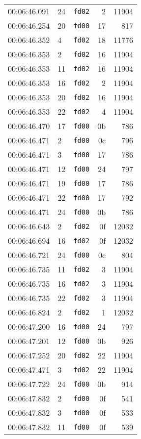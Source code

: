 \documentclass{article}
\begin{document}
\begin{longtable}{lllrr}
00:06:46.091 & 24 & \texttt{fd02} & 2 & 11904 \\
00:06:46.254 & 20 & \texttt{fd00} & 17 & 817 \\
00:06:46.352 & 4 & \texttt{fd02} & 18 & 11776 \\
00:06:46.353 & 2 & \texttt{fd02} & 16 & 11904 \\
00:06:46.353 & 11 & \texttt{fd02} & 16 & 11904 \\
00:06:46.353 & 16 & \texttt{fd02} & 2 & 11904 \\
00:06:46.353 & 20 & \texttt{fd02} & 16 & 11904 \\
00:06:46.353 & 22 & \texttt{fd02} & 4 & 11904 \\
00:06:46.470 & 17 & \texttt{fd00} & 0b & 786 \\
00:06:46.471 & 2 & \texttt{fd00} & 0c & 796 \\
00:06:46.471 & 3 & \texttt{fd00} & 17 & 786 \\
00:06:46.471 & 12 & \texttt{fd00} & 24 & 797 \\
00:06:46.471 & 19 & \texttt{fd00} & 17 & 786 \\
00:06:46.471 & 22 & \texttt{fd00} & 17 & 792 \\
00:06:46.471 & 24 & \texttt{fd00} & 0b & 786 \\
00:06:46.643 & 2 & \texttt{fd02} & 0f & 12032 \\
00:06:46.694 & 16 & \texttt{fd02} & 0f & 12032 \\
00:06:46.721 & 24 & \texttt{fd00} & 0c & 804 \\
00:06:46.735 & 11 & \texttt{fd02} & 3 & 11904 \\
00:06:46.735 & 16 & \texttt{fd02} & 3 & 11904 \\
00:06:46.735 & 22 & \texttt{fd02} & 3 & 11904 \\
00:06:46.824 & 2 & \texttt{fd02} & 1 & 12032 \\
00:06:47.200 & 16 & \texttt{fd00} & 24 & 797 \\
00:06:47.201 & 12 & \texttt{fd00} & 0b & 926 \\
00:06:47.252 & 20 & \texttt{fd02} & 22 & 11904 \\
00:06:47.471 & 3 & \texttt{fd02} & 22 & 11904 \\
00:06:47.722 & 24 & \texttt{fd00} & 0b & 914 \\
00:06:47.832 & 2 & \texttt{fd00} & 0f & 541 \\
00:06:47.832 & 3 & \texttt{fd00} & 0f & 533 \\
00:06:47.832 & 11 & \texttt{fd00} & 0f & 539 \\

\end{longtable}
\end{document}
